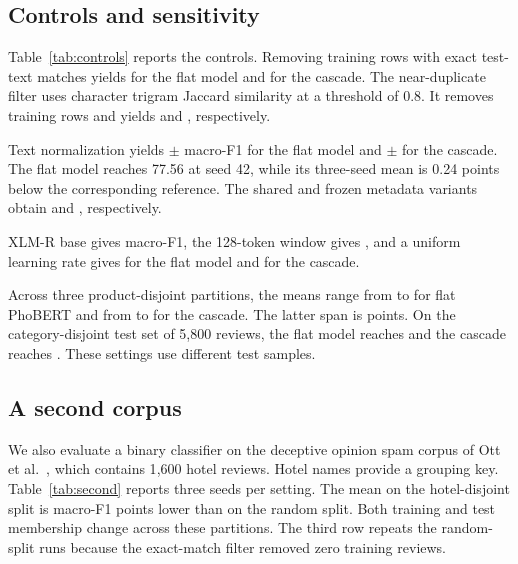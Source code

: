 \documentclass[12pt,a4paper]{article}
\begin{document}
\subsection{Controls and sensitivity}
Table~\ref{tab:controls} reports the controls. Removing \DedupRemoved{} training rows with exact test-text matches yields \DedupSingleFone{} for the flat model and \DedupMultiFone{} for the cascade. The near-duplicate filter uses character trigram Jaccard similarity at a threshold of 0.8. It removes \NearRemoved{} training rows and yields \NearSingleFone{} and \NearMultiFone{}, respectively.

Text normalization yields \NormSingleFone{} $\pm$ \NormSingleSd{} macro-F1 for the flat model and \NormMultiFone{} $\pm$ \NormMultiSd{} for the cascade. The flat model reaches 77.56 at seed 42, while its three-seed mean is 0.24 points below the corresponding reference. The shared and frozen metadata variants obtain \FusionFone{} and \FusionTwoFone{}, respectively.

XLM-R base gives \XlmrFone{} macro-F1, the 128-token window gives \LenFone{}, and a uniform learning rate gives \LrSingleFone{} for the flat model and \LrMultiFone{} for the cascade.

Across three product-disjoint partitions, the means range from \SplitSingleMin{} to \SplitSingleMax{} for flat PhoBERT and from \SplitMultiMin{} to \SplitMultiMax{} for the cascade. The latter span is \SplitSpread{} points. On the category-disjoint test set of 5{,}800 reviews, the flat model reaches \CategorySingleFone{} and the cascade reaches \CategoryMultiFone{}. These settings use different test samples.

\subsection{A second corpus}
We also evaluate a binary classifier on the deceptive opinion spam corpus of Ott et al.\ \cite{ott2011}, which contains 1{,}600 hotel reviews. Hotel names provide a grouping key. Table~\ref{tab:second} reports three seeds per setting. The mean on the hotel-disjoint split is \OttMaxDelta{} macro-F1 points lower than on the random split. Both training and test membership change across these partitions. The third row repeats the random-split runs because the exact-match filter removed zero training reviews.
\end{document}
